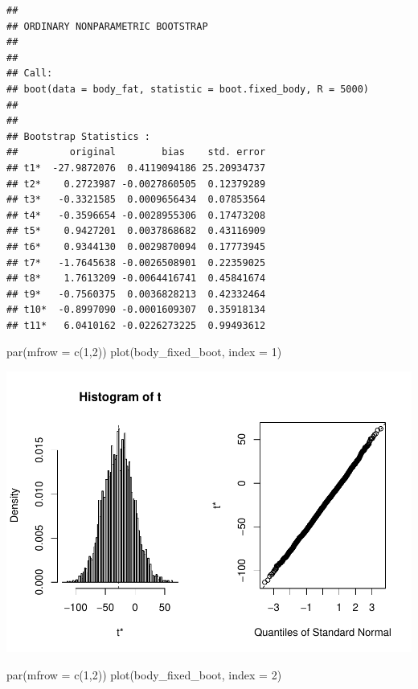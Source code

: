 \documentclass[
]{article}
\newenvironment{Shaded}{\begin{snugshade}}{\end{snugshade}}
\newcommand{\AttributeTok}[1]{\textcolor[rgb]{0.77,0.63,0.00}{#1}}
\newcommand{\DecValTok}[1]{\textcolor[rgb]{0.00,0.00,0.81}{#1}}
\newcommand{\FunctionTok}[1]{\textcolor[rgb]{0.00,0.00,0.00}{#1}}
\newcommand{\NormalTok}[1]{#1}
\begin{document}
\begin{verbatim}
## 
## ORDINARY NONPARAMETRIC BOOTSTRAP
## 
## 
## Call:
## boot(data = body_fat, statistic = boot.fixed_body, R = 5000)
## 
## 
## Bootstrap Statistics :
##         original        bias    std. error
## t1*  -27.9872076  0.4119094186 25.20934737
## t2*    0.2723987 -0.0027860505  0.12379289
## t3*   -0.3321585  0.0009656434  0.07853564
## t4*   -0.3596654 -0.0028955306  0.17473208
## t5*    0.9427201  0.0037868682  0.43116909
## t6*    0.9344130  0.0029870094  0.17773945
## t7*   -1.7645638 -0.0026508901  0.22359025
## t8*    1.7613209 -0.0064416741  0.45841674
## t9*   -0.7560375  0.0036828213  0.42332464
## t10*  -0.8997090 -0.0001609307  0.35918134
## t11*   6.0410162 -0.0226273225  0.99493612
\end{verbatim}

\begin{Shaded}
\begin{Highlighting}[]
\FunctionTok{par}\NormalTok{(}\AttributeTok{mfrow =} \FunctionTok{c}\NormalTok{(}\DecValTok{1}\NormalTok{,}\DecValTok{2}\NormalTok{))}
\FunctionTok{plot}\NormalTok{(body\_fixed\_boot, }\AttributeTok{index =} \DecValTok{1}\NormalTok{)}
\end{Highlighting}
\end{Shaded}

\includegraphics{STAT641_Final_Report_files/figure-latex/unnamed-chunk-9-1.pdf}

\begin{Shaded}
\begin{Highlighting}[]
\FunctionTok{par}\NormalTok{(}\AttributeTok{mfrow =} \FunctionTok{c}\NormalTok{(}\DecValTok{1}\NormalTok{,}\DecValTok{2}\NormalTok{))}
\FunctionTok{plot}\NormalTok{(body\_fixed\_boot, }\AttributeTok{index =} \DecValTok{2}\NormalTok{)}
\end{Highlighting}
\end{Shaded}
\end{document}
